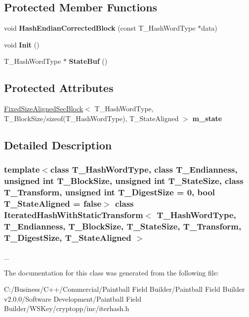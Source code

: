 \subsection*{Protected Member Functions}
\begin{DoxyCompactItemize}
\item 
\hypertarget{class_iterated_hash_with_static_transform_a7e9c0d5d95a68679254b3171497f156b}{
void {\bfseries HashEndianCorrectedBlock} (const T\_\-HashWordType $\ast$data)}
\label{class_iterated_hash_with_static_transform_a7e9c0d5d95a68679254b3171497f156b}

\item 
\hypertarget{class_iterated_hash_with_static_transform_a3d2a82447c194cd8b2a08235ecede525}{
void {\bfseries Init} ()}
\label{class_iterated_hash_with_static_transform_a3d2a82447c194cd8b2a08235ecede525}

\item 
\hypertarget{class_iterated_hash_with_static_transform_a4b472107b2264adddea33edab8b4dbc6}{
T\_\-HashWordType $\ast$ {\bfseries StateBuf} ()}
\label{class_iterated_hash_with_static_transform_a4b472107b2264adddea33edab8b4dbc6}

\end{DoxyCompactItemize}
\subsection*{Protected Attributes}
\begin{DoxyCompactItemize}
\item 
\hypertarget{class_iterated_hash_with_static_transform_a34a7b32751931968c8b86cf1630a6381}{
\hyperlink{class_fixed_size_aligned_sec_block}{FixedSizeAlignedSecBlock}$<$ T\_\-HashWordType, T\_\-BlockSize/sizeof(T\_\-HashWordType), T\_\-StateAligned $>$ {\bfseries m\_\-state}}
\label{class_iterated_hash_with_static_transform_a34a7b32751931968c8b86cf1630a6381}

\end{DoxyCompactItemize}


\subsection{Detailed Description}
\subsubsection*{template$<$class T\_\-HashWordType, class T\_\-Endianness, unsigned int T\_\-BlockSize, unsigned int T\_\-StateSize, class T\_\-Transform, unsigned int T\_\-DigestSize = 0, bool T\_\-StateAligned = false$>$ class IteratedHashWithStaticTransform$<$ T\_\-HashWordType, T\_\-Endianness, T\_\-BlockSize, T\_\-StateSize, T\_\-Transform, T\_\-DigestSize, T\_\-StateAligned $>$}

\_\- 

The documentation for this class was generated from the following file:\begin{DoxyCompactItemize}
\item 
C:/Business/C++/Commercial/Paintball Field Builder/Paintball Field Builder v2.0.0/Software Development/Paintball Field Builder/WSKey/cryptopp/inc/iterhash.h\end{DoxyCompactItemize}
